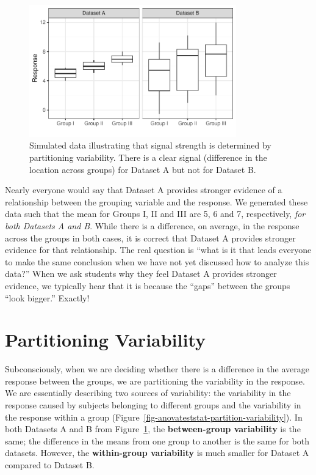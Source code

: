 \documentclass[
  letterpaper,
  DIV=11,
  numbers=noendperiod]{scrreprt}
\theoremstyle{definition}
\theoremstyle{definition}
\theoremstyle{plain}
\theoremstyle{remark}
\begin{document}
\begin{figure}

{\centering \includegraphics[width=0.8\textwidth,height=\textheight]{./images/fig-anovateststat-boxplots-1.pdf}

}

\caption{\label{fig-anovateststat-boxplots}Simulated data illustrating
that signal strength is determined by partitioning variability. There is
a clear signal (difference in the location across groups) for Dataset A
but not for Dataset B.}

\end{figure}

Nearly everyone would say that Dataset A provides stronger evidence of a
relationship between the grouping variable and the response. We
generated these data such that the mean for Groups I, II and III are 5,
6 and 7, respectively, \emph{for both Datasets A and B}. While there is
a difference, on average, in the response across the groups in both
cases, it is correct that Dataset A provides stronger evidence for that
relationship. The real question is ``what is it that leads everyone to
make the same conclusion when we have not yet discussed how to analyze
this data?'' When we ask students why they feel Dataset A provides
stronger evidence, we typically hear that it is because the ``gaps''
between the groups ``look bigger.'' Exactly!

\hypertarget{partitioning-variability-1}{%
\section{Partitioning Variability}\label{partitioning-variability-1}}

Subconsciously, when we are deciding whether there is a difference in
the average response between the groups, we are partitioning the
variability in the response. We are essentially describing two sources
of variability: the variability in the response caused by subjects
belonging to different groups and the variability in the response within
a group (Figure~\ref{fig-anovateststat-partition-variability}). In both
Datasets A and B from Figure~\ref{fig-anovateststat-boxplots}, the
\textbf{between-group variability} is the same; the difference in the
means from one group to another is the same for both datasets. However,
the \textbf{within-group variability} is much smaller for Dataset A
compared to Dataset B.
\end{document}
